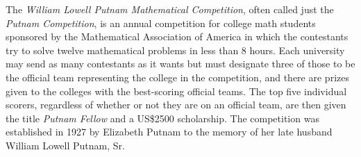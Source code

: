\documentclass[12pt]{article}
\begin{document}

The {\em William Lowell Putnam Mathematical Competition}, often called just the {\em Putnam Competition}, is an annual competition for college math students sponsored by the Mathematical Association of America in which the contestants try to solve twelve mathematical problems in less than 8 hours. Each university may send as many contestants as it wants but must designate three of those to be the official team representing the college in the competition, and there are prizes given to the colleges with the best-scoring official teams. The top five individual scorers, regardless of whether or not they are on an official team, are then given the title {\em Putnam Fellow} and a US\$2500 scholarship. The competition was established in 1927 by Elizabeth Putnam to the memory of her late husband William Lowell Putnam, Sr.
\end{document}
